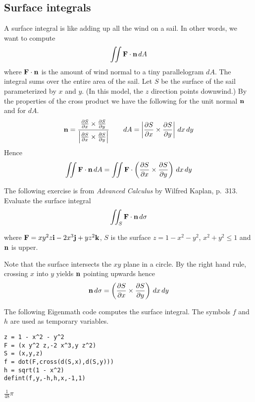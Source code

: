 
\subsection{Surface integrals}
A surface integral is like adding up all the wind on a sail.
In other words, we want to compute
$$\int\!\!\!\int{\bf F\cdot n}\,dA$$
where ${\bf F\cdot n}$ is the amount of wind normal to a tiny parallelogram $dA$.
The integral sums over the entire area of the sail.
Let $S$ be the surface of the sail parameterized by $x$ and $y$.
(In this model, the $z$ direction points downwind.)
By the properties of the cross product we have the following for the unit normal $\bf n$
and for $dA$.
$${\bf n}={ {{\partial S\over\partial x}\times{\partial S\over\partial y}}\over
 {\left|{\partial S\over\partial x}\times{\partial S\over\partial y}\right|}}\qquad
dA=\left|{\partial S\over\partial x}\times{\partial S\over\partial y}\right|\,dx\,dy$$
Hence
$$\int\!\!\!\int{\bf F\cdot n}\,dA=\int\!\!\!\int{\bf F}\cdot
\left({{\partial S\over\partial x}\times{\partial S\over\partial y}}\right)\,dx\,dy$$

\bigskip
\noindent
The following exercise is from
{\it Advanced Calculus} by Wilfred Kaplan, p.~313.
Evaluate the surface integral
$$\int\!\!\!\int_S{\bf F\cdot n}\,d\sigma$$

\noindent
where ${\bf F}=xy^2z{\bf i}-2x^3{\bf j}+yz^2{\bf k}$, $S$ is the surface
$z=1-x^2-y^2$, $x^2+y^2\le1$ and $\bf n$ is upper.

\bigskip
\noindent
Note that the surface intersects the $xy$ plane in a circle.
By the right hand rule, crossing $x$ into $y$ yields $\bf n$ pointing upwards hence
$${\bf n}\,d\sigma=\left({{\partial S\over\partial x}\times{\partial S\over\partial y}}\right)\,dx\,dy$$

\noindent
The following Eigenmath code computes the surface integral.
The symbols $f$ and $h$ are used as temporary variables.

\begin{Verbatim}[formatcom=\color{blue},samepage=true]
z = 1 - x^2 - y^2
F = (x y^2 z,-2 x^3,y z^2)
S = (x,y,z)
f = dot(F,cross(d(S,x),d(S,y)))
h = sqrt(1 - x^2)
defint(f,y,-h,h,x,-1,1)
\end{Verbatim}

\noindent
$\displaystyle \frac{1}{48}\pi$
